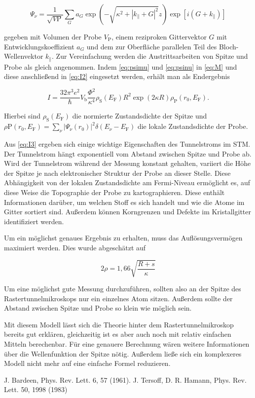 \documentclass[
	a4paper,
	12pt,
	pagesize,
	ngerman
]{scrartcl}
\begin{document}
\begin{equation}
	\Psi_\nu = \frac{1}{\sqrt{V\text{P}}} \sum_{G} a_G \exp(-\sqrt{\kappa^2 + |k_\parallel + G|^2}z) \exp[i(G + k_\parallel)]
	\label{eq:psinu}
\end{equation}

gegeben mit Volumen der Probe $V_\text{P}$, einem reziproken Gittervektor $G$ mit Entwicklungskoeffizient $a_G$ und dem zur Oberfläche parallelen Teil des Bloch-Wellenvektor $k_\parallel$.
Zur Vereinfachung werden die Austrittsarbeiten von Spitze und Probe als gleich angenommen. Indem \cref{eq:psimu} und \cref{eq:psinu} in \cref{eq:M} und diese anschließend in \cref{eq:I2} eingesetzt werden, erhält man als Endergebnis

\begin{equation}
	I = \frac{32 \pi^3 e^2}{\hbar} V_{\text{b}} \frac{\Phi^2}{\kappa^4} \rho_\text{S}(E_\text{F}) R^2 \exp(2 \kappa R) \rho_\text{P}(r_0, E_\text{F}).
	\label{eq:I3}
\end{equation}

Hierbei sind $\rho_\text{S}(E_\text{F})$ die normierte Zustandsdichte der Spitze und $\rho\text{P}(r_0, E_\text{F}) = \sum_{\nu} |\Psi_\nu(r_0)|^2 \delta(E_\nu - E_\text{F})$ die lokale Zustandsdichte der Probe.

Aus \cref{eq:I3} ergeben sich einige wichtige Eigenschaften des Tunnelstroms im STM. Der Tunnelstrom hängt exponentiell vom Abstand zwischen Spitze und Probe ab.
Wird der Tunnelstrom während der Messung konstant gehalten, variiert die Höhe der Spitze je nach elektronischer Struktur der Probe an dieser Stelle. Diese Abhängigkeit von der lokalen Zustandsdichte am Fermi-Niveau ermöglicht es, auf diese Weise die Topographie der Probe zu kartographieren. Diese enthält Informationen darüber, um welchen Stoff es sich handelt und wie die Atome im Gitter sortiert sind. Außerdem können Korngrenzen und Defekte im Kristallgitter identifiziert werden.

Um ein möglichst genaues Ergebnis zu erhalten, muss das Auflösungsvermögen maximiert werden. Dies wurde abgeschätzt auf

\begin{equation}
	2\rho = 1,66 \sqrt{\frac{R + s}{\kappa}}
	\label{eq:sigma}
\end{equation}

Um eine möglichst gute Messung durchzuführen, sollten also an der Spitze des Rastertunnelmikroskops nur ein einzelnes Atom sitzen. Außerdem sollte der Abstand zwischen Spitze und Probe so klein wie möglich sein.

Mit diesem Modell lässt sich die Theorie hinter dem Rastertunnelmikroskop bereits gut erklären, gleichzeitig ist es aber auch noch mit relativ einfachen Mitteln berechenbar. Für eine genauere Berechnung wären weitere Informationen über die Wellenfunktion der Spitze nötig. Außerdem ließe sich ein komplexeres Modell nicht mehr auf eine einfache Formel reduzieren.

\newpage

\begin{thebibliography}{9}
	J. Bardeen, Phys. Rev. Lett. 6, 57 (1961).
	J. Tersoff, D. R. Hamann, Phys. Rev. Lett. 50, 1998 (1983)
\end{thebibliography}
\end{document}

